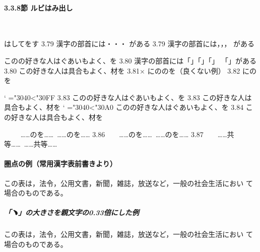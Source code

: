 \documentclass[a4paper,10ptj]{ltjsarticle}
\begin{document}
\paragraph{3.3.8節 ルビはみ出し}\ 
\begin{LTXexample}[pos=t]
 はしてをす
3.79 漢字の部首には・・・%
     がある
3.79 漢字の部首には，，，%
     \ruby{旁}{つくり}がある
\end{LTXexample}
\begin{LTXexample}[pos=t]
 このの好きな人はぐあいもよく、を
3.80 漢字の部首には「」「」「」%
「」がある
3.80 この好きな人は具合もよく、材を
3.81× にの\zw のを（良くない例）
3.82 に\ruby{暁}{あかつき}の\ruby{趣}{おもむき}を

{%
  \catcode`%
  \makeatletter\count@="3040\loop\relax\ifnum \count@<"30FF%
  \advance{} \repeat
3.83 このの好きな人はぐあいもよく、を
3.83 この\ruby{\噂}{うわさ}好きな人は\ruby{懐}{ふところ}具合もよく、\ruby{檜}{ひのき}材を
}
{\catcode`%
  \makeatletter\count@="3040\loop\relax\ifnum \count@<"30A0%
  \advance{}  このの好きな人はぐあいもよく、を
3.84 この\ruby{\噂}{うわさ}好きな人は\ruby{懐}{ふところ}具合もよく、\ruby{檜}{ひのき}材を
}
\end{LTXexample}
\begin{LTXexample}[pos=t]
\ {%
\hbox{\vrule\vbox{\zw
　\zw……のを……%
\hskip9\zw……の\ruby{徑}{こみち}を……}\vrule}}
3.86\ \hbox{\vrule\vbox{\zw
　\zw……のを……%
\zw……の\ruby{徑}{こみち}を……}\vrule}
3.87\  \hbox{\vrule\vbox{\zw
　\zw……共等……%
\zw……共\ruby{飾り}{アクセサリー}等……}\vrule}
\end{LTXexample}


\paragraph{圏点の例（常用漢字表前書きより）}
この表は，法令，公⽤⽂書，新聞，雑誌，放送など，⼀般の社会⽣活におい%
て場合のものである。

\subparagraph{「﹅」の大きさを親文字の0.33倍にした例}
この表は，法令，公⽤⽂書，新聞，雑誌，放送など，⼀般の社会⽣活におい%
て場合のものである。
\end{document}
